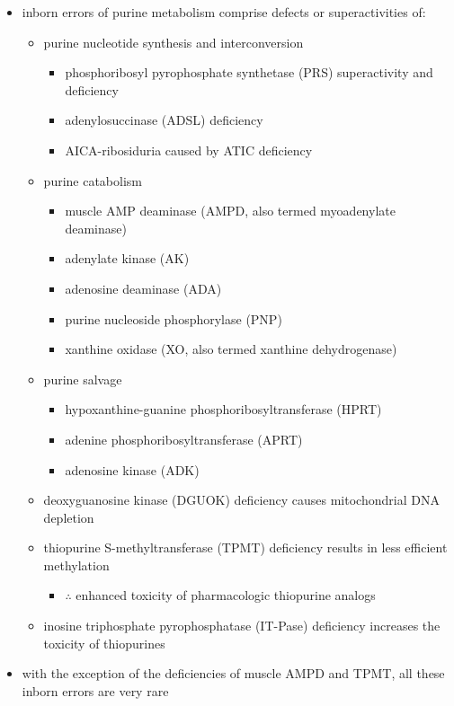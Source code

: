 \documentclass[12pt]{scrartcl}
\begin{document}
\begin{itemize}
\item inborn errors of purine metabolism comprise defects or
superactivities of:

\begin{itemize}
\item purine nucleotide synthesis and interconversion
\begin{itemize}
\item phosphoribosyl pyrophosphate synthetase (PRS) superactivity and deficiency
\item adenylosuccinase (ADSL) deficiency
\item AICA-ribosiduria caused by ATIC deficiency
\end{itemize}
\item purine catabolism
\begin{itemize}
\item muscle AMP deaminase (AMPD, also termed myoadenylate deaminase)
\item adenylate kinase (AK)
\item adenosine deaminase (ADA)
\item purine nucleoside phosphorylase (PNP)
\item xanthine oxidase (XO, also termed xanthine dehydrogenase)
\end{itemize}
\item purine salvage
\begin{itemize}
\item hypoxanthine-guanine phosphoribosyltransferase (HPRT)
\item adenine phosphoribosyltransferase (APRT)
\item adenosine kinase (ADK)
\end{itemize}
\item deoxyguanosine kinase (DGUOK) deficiency causes mitochondrial DNA depletion
\item thiopurine S-methyltransferase (TPMT) deficiency results in less
efficient methylation
\begin{itemize}
\item \(\therefore\) enhanced toxicity of pharmacologic thiopurine analogs
\end{itemize}
\item inosine triphosphate pyrophosphatase (IT-Pase) deficiency
increases the toxicity of thiopurines
\end{itemize}
\item with the exception of the deficiencies of muscle AMPD and TPMT, all
these inborn errors are very rare
\end{itemize}
\end{document}
